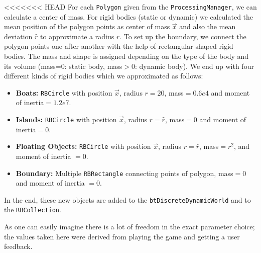 <<<<<<< HEAD
For each \texttt{Polygon} given from the \texttt{ProcessingManager}, we can calculate a center of mass. For rigid bodies (static or dynamic) we calculated the mean position of the polygon points as center of mass $\vec{x}$ and also the mean deviation $\hat{r}$ to approximate a radius $r$. To set up the boundary, we connect the polygon points one after another with the help of rectangular shaped rigid bodies. The mass and shape is assigned depending on the type of the body and its volume (mass=0: static body, mass$>$0: dynamic body). We end up with four different kinds of rigid bodies which we approximated as follows:
\begin{itemize}
\item \textbf{Boats:} \texttt{RBCircle} with position $\vec{x}$, radius $r=20$, mass$=0.6e4$ and moment of inertia$=1.2e7$.
\item \textbf{Islands:} \texttt{RBCircle} with position $\vec{x}$, radius $r=\hat{r}$, mass$=0$ and moment of inertia$=0$.
\item \textbf{Floating Objects:} \texttt{RBCircle} with position $\vec{x}$, radius $r=\hat{r}$, mass$=r^2$, and moment of inertia $=0$.
\item \textbf{Boundary:} Multiple \texttt{RBRectangle} connecting points of polygon, mass$=0$ and moment of inertia $=0$.
\end{itemize}
In the end, these new objects are added to the \texttt{btDiscreteDynamicWorld} and to the \texttt{RBCollection}.


As one can easily imagine there is a lot of freedom in the exact parameter choice; the values taken here were derived from playing the game and getting a user feedback.

